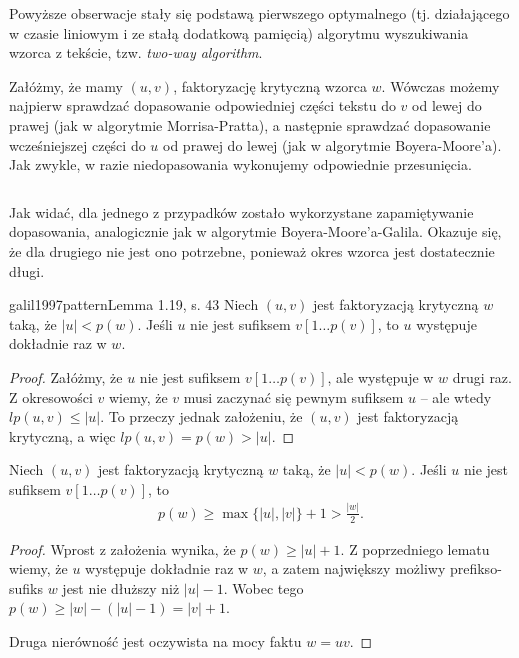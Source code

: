 Powyższe obserwacje stały się podstawą pierwszego optymalnego (tj. działającego w czasie liniowym i ze stałą dodatkową pamięcią) algorytmu wyszukiwania wzorca z tekście, tzw. \emph{two-way algorithm}.

Załóżmy, że mamy $(u, v)$, faktoryzację krytyczną wzorca $w$. Wówczas możemy najpierw sprawdzać dopasowanie odpowiedniej części tekstu do $v$ od lewej do prawej (jak w algorytmie Morrisa-Pratta), a następnie sprawdzać dopasowanie wcześniejszej części do $u$ od prawej do lewej (jak w algorytmie Boyera-Moore'a). Jak zwykle, w razie niedopasowania wykonujemy odpowiednie przesunięcia.

\begin{code}
\inputminted{python}{code/exact-string-matching/two-way.py}
\label{alg:exact-string-matching-two-way}
\end{code}

Jak widać, dla jednego z przypadków zostało wykorzystane zapamiętywanie dopasowania, analogicznie jak w algorytmie Boyera-Moore'a-Galila.
Okazuje się, że dla drugiego nie jest ono potrzebne, ponieważ okres wzorca jest dostatecznie długi.

\begin{lemma}{galil1997pattern}{Lemma 1.19, s. 43}
  Niech $(u, v)$ jest faktoryzacją krytyczną $w$ taką, że $|u| < p(w)$. Jeśli $u$ nie jest sufiksem $v[1 \ldots p(v)]$, to $u$ występuje dokładnie raz w $w$.
\end{lemma}

\begin{proof}
  Załóżmy, że $u$ nie jest sufiksem $v[1 \ldots p(v)]$, ale występuje w $w$ drugi raz.
  Z okresowości $v$ wiemy, że $v$ musi zaczynać się pewnym sufiksem $u$ -- ale wtedy $lp(u, v) \le |u|$.
  To przeczy jednak założeniu, że $(u, v)$ jest faktoryzacją krytyczną, a więc $lp(u, v) = p(w) > |u|$.
\end{proof}

\begin{corollary}{}{}
  \label{col:long-period}
  Niech $(u, v)$ jest faktoryzacją krytyczną $w$ taką, że $|u| < p(w)$. Jeśli $u$ nie jest sufiksem $v[1 \ldots p(v)]$, to
  \begin{align*}
    p(w) \ge \max\{|u|, |v|\} + 1 > \frac{|w|}{2}.
  \end{align*}
\end{corollary}

\begin{proof}
  Wprost z założenia wynika, że $p(w) \ge |u| + 1$.
  Z poprzedniego lematu wiemy, że $u$ występuje dokładnie raz w $w$, a zatem największy możliwy prefikso-sufiks $w$ jest nie dłuższy niż $|u| - 1$.
  Wobec tego $p(w) \ge |w| - (|u| - 1) = |v| + 1$.
  
  Druga nierówność jest oczywista na mocy faktu $w = uv$.
\end{proof}

